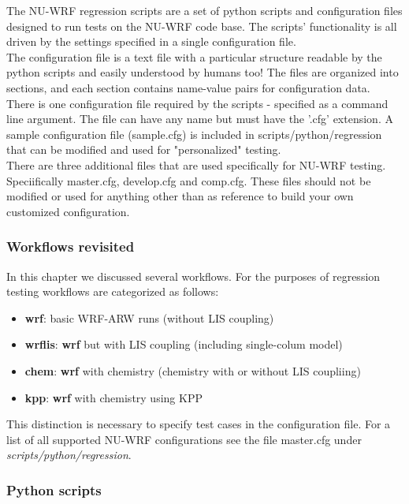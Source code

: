 The NU-WRF regression scripts are a set of python scripts and configuration
files designed to run tests on the NU-WRF code base.
The scripts' functionality is all driven by the settings specified in a single
configuration file.\\

The configuration file is a text file with a particular structure readable by
the python scripts and easily understood by humans too! The files are organized
into sections, and each section contains name-value pairs for configuration data.\\

There is one configuration file required by the scripts - specified as a command
line argument. The file can have any name but must have the '.cfg' extension.
A sample configuration file (sample.cfg) is included in scripts/python/regression
that can be modified and used for "personalized" testing. \\

There are three additional files that are used specifically for NU-WRF testing. Speciifically
master.cfg, develop.cfg and comp.cfg. These files should not be modified or used for anything
other than as reference to build your own customized configuration.

\subsubsection{Workflows revisited}

In this chapter we discussed several workflows. For the purposes of regression testing
workflows are categorized as follows:

\begin{itemize}
\item   \textbf{wrf}: basic WRF-ARW runs (without LIS coupling)
\item  \textbf{wrflis}:  \textbf{wrf }but with LIS coupling (including single-colum model)
\item   \textbf{chem}:  \textbf{wrf} with chemistry (chemistry with or without LIS coupliing)
\item   \textbf{kpp}: \textbf{wrf} with chemistry using KPP
\end{itemize}

This distinction is necessary to specify test cases in the configuration file.
For a list of all supported NU-WRF configurations see the file master.cfg under
\emph{scripts/python/regression}.


\subsubsection{Python scripts}

